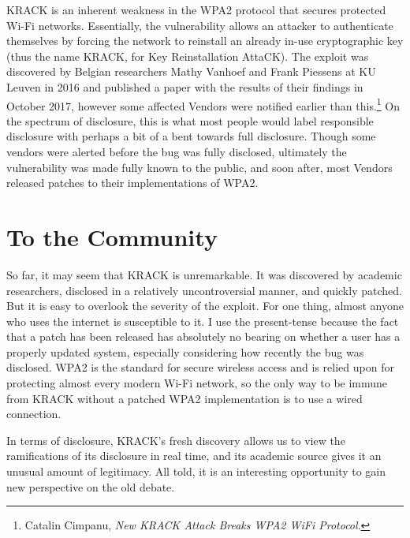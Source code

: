 \documentclass[12pt]{article}
\begin{document}
\begin{doublespace}
KRACK is an inherent weakness in the WPA2 protocol that
secures protected Wi-Fi networks. Essentially, the vulnerability allows an
attacker to authenticate themselves by forcing the network to reinstall an
already in-use cryptographic key (thus the name KRACK, for Key Reinstallation
AttaCK). The exploit was discovered by Belgian researchers Mathy Vanhoef and
Frank Piessens at KU Leuven in 2016 and published a paper with the results
of their findings in October 2017, however some affected Vendors were notified
earlier than this.\footnote{Catalin Cimpanu, \textit{New KRACK Attack Breaks WPA2 WiFi Protocol}.} On the spectrum of disclosure,
this is what most people would label responsible disclosure with perhaps a bit
of a bent towards full disclosure. Though some vendors were alerted before the
bug was fully disclosed, ultimately the vulnerability was made fully
known to the public, and soon after, most Vendors released patches to their
implementations of WPA2.

\section*{To the Community}
So far, it may seem that KRACK is unremarkable. It was discovered by academic
researchers, disclosed in a relatively uncontroversial manner, and quickly
patched. But it is easy to overlook the severity of the exploit. For one thing,
almost anyone who uses the internet is susceptible to it. I use the
present-tense because the fact that a patch has been released has absolutely
no bearing on whether a user has a properly updated system, especially
considering how recently the bug was disclosed. WPA2 is the standard
for secure wireless access and is relied upon for protecting almost every
modern Wi-Fi network, so the only way to be immune from KRACK without a patched
WPA2 implementation is to use a wired connection.

In terms of disclosure, KRACK's fresh discovery allows us to view the
ramifications of its disclosure in real time, and its academic source gives it
an unusual amount of legitimacy. All told, it is an interesting
opportunity to gain new perspective on the old debate.


\end{doublespace}
\end{document}

